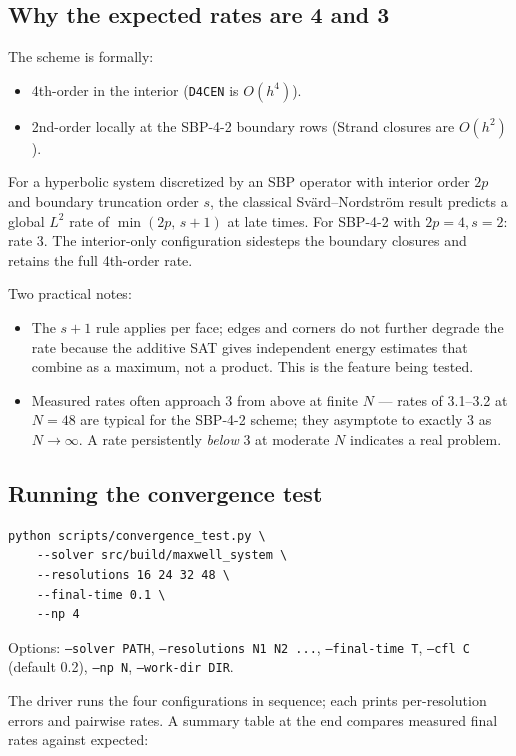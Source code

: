 \documentclass[11pt]{article}
\begin{document}
\subsection{Why the expected rates are 4 and 3}

The scheme is formally:
\begin{itemize}[itemsep=1pt,topsep=2pt]
  \item 4th-order in the interior (\texttt{D4CEN} is $O(h^4)$).
  \item 2nd-order locally at the SBP-4-2 boundary rows (Strand
        closures are $O(h^2)$).
\end{itemize}
For a hyperbolic system discretized by an SBP operator with
interior order $2p$ and boundary truncation order $s$, the
classical Svärd--Nordström result predicts a global $L^2$ rate of
$\min(2p,\, s + 1)$ at late times.  For SBP-4-2 with $2p = 4,
s = 2$: rate 3.  The interior-only configuration sidesteps the
boundary closures and retains the full 4th-order rate.

Two practical notes:
\begin{itemize}[itemsep=2pt,topsep=2pt]
  \item The $s + 1$ rule applies per face; edges and corners do
        not further degrade the rate because the additive SAT
        gives independent energy estimates that combine as a
        maximum, not a product.  This is the feature being tested.
  \item Measured rates often approach 3 from above at finite $N$
        --- rates of 3.1--3.2 at $N = 48$ are typical for the
        SBP-4-2 scheme; they asymptote to exactly 3 as
        $N \to \infty$.  A rate persistently \emph{below} 3 at
        moderate $N$ indicates a real problem.
\end{itemize}

\subsection{Running the convergence test}

\begin{lstlisting}[style=shell]
python scripts/convergence_test.py \
    --solver src/build/maxwell_system \
    --resolutions 16 24 32 48 \
    --final-time 0.1 \
    --np 4
\end{lstlisting}
Options: \texttt{--solver PATH}, \texttt{--resolutions N1 N2 ...},
\texttt{--final-time T}, \texttt{--cfl C} (default 0.2),
\texttt{--np N}, \texttt{--work-dir DIR}.

The driver runs the four configurations in sequence; each prints
per-resolution errors and pairwise rates.  A summary table at the
end compares measured final rates against expected:
\end{document}
